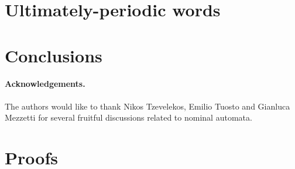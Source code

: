\documentclass[orivec]{llncs}
\begin{document}
\section{Ultimately-periodic words}\label{sec:up-words}



\section{Conclusions}\label{sec:conclusions}



\paragraph{Acknowledgements.} The authors would like to thank Nikos Tzevelekos, Emilio Tuosto and Gianluca Mezzetti for several fruitful discussions related to nominal automata.





\appendix
\section{Proofs}

\end{document}

